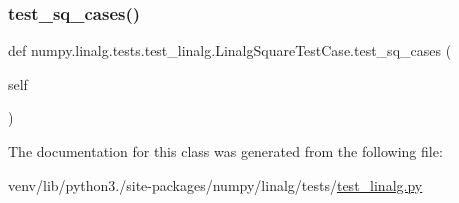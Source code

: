 \subsubsection{\texorpdfstring{test\+\_\+sq\+\_\+cases()}{test\_sq\_cases()}}
{\footnotesize\ttfamily def numpy.\+linalg.\+tests.\+test\+\_\+linalg.\+Linalg\+Square\+Test\+Case.\+test\+\_\+sq\+\_\+cases (\begin{DoxyParamCaption}\item[{}]{self }\end{DoxyParamCaption})}



The documentation for this class was generated from the following file\+:\begin{DoxyCompactItemize}
\item 
venv/lib/python3./site-\/packages/numpy/linalg/tests/\hyperlink{test__linalg_8py}{test\+\_\+linalg.\+py}\end{DoxyCompactItemize}
